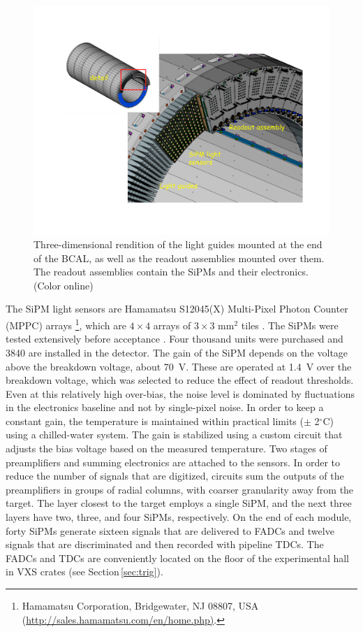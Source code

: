 \begin{figure}[tbp]\centering
\includegraphics[scale=0.4]{figures/bcal_assemblies.pdf}
\caption{\label{fig:bcal:bcal_assemblies}
   Three-dimensional rendition of the light guides mounted at the end of the 
   BCAL, as well as the readout assemblies mounted over them. The 
   readout assemblies contain the 
   SiPMs and their electronics.  (Color online)
  }
\end{figure}


The SiPM light sensors are Hamamatsu S12045(X) Multi-Pixel Photon Counter (MPPC) arrays \footnote{Hamamatsu Corporation, Bridgewater, NJ 08807, USA \\ (\url{http://sales.hamamatsu.com/en/home.php)}.}, 
which are $4\times4$ arrays of $3\times3$ mm$^2$ tiles \cite{hdnote2913}. The SiPMs were tested extensively before acceptance \cite{Barbosa2012100,Qiang2013234,soto,Soto201489,BeattieIEEE,doi:10.1063/1.4955340}. Four thousand units were purchased and 3840 are installed in the detector. The gain of the SiPM depends on the voltage above the breakdown voltage, about 70~V. These are operated at 1.4~V over the breakdown voltage, which was selected to reduce the effect of readout thresholds. Even at this relatively high over-bias, the noise level is dominated by fluctuations in the electronics baseline and not by single-pixel noise. In order to keep a constant gain, the temperature is maintained within practical limits ($\pm$ 2$^\circ$C) using a chilled-water system. The gain is stabilized using a custom circuit that adjusts the bias voltage based on the measured temperature. Two stages of preamplifiers and summing electronics are attached to the sensors. In order to reduce the number of signals that are digitized, circuits sum the outputs of the preamplifiers in groups of radial columns, with coarser granularity away from the target. The layer closest to the target employs a single SiPM, and the next three layers have two, three, and four SiPMs, respectively. On the end of each module, forty SiPMs generate sixteen signals that are delivered to FADCs and twelve signals that are discriminated and then recorded with pipeline TDCs. The FADCs and TDCs are conveniently located on the floor of the experimental hall in VXS crates (see Section\,\ref{sec:trig}).

